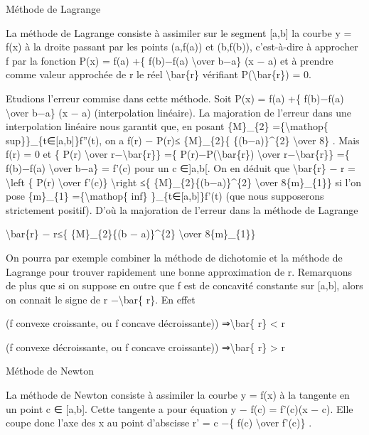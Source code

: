 \documentclass[]{article}
\begin{document}
Méthode de Lagrange

La méthode de Lagrange consiste à assimiler sur le segment {[}a,b{]} la
courbe y = f(x) à la droite passant par les points (a,f(a)) et (b,f(b)),
c'est-à-dire à approcher f par la fonction P(x) = f(a) +\{ f(b)−f(a)
\textbackslash{}over b−a\} (x − a) et à prendre comme valeur approchée
de r le réel \textbackslash{}bar\{r\} vérifiant
P(\textbackslash{}bar\{r\}) = 0.

Etudions l'erreur commise dans cette méthode. Soit P(x) = f(a) +\{
f(b)−f(a) \textbackslash{}over b−a\} (x − a) (interpolation linéaire).
La majoration de l'erreur dans une interpolation linéaire nous garantit
que, en posant \{M\}\_\{2\} =\{\textbackslash{}mathop\{
sup\}\}\_\{t∈{[}a,b{]}\}\textbar{}f''(t)\textbar{}, on a \textbar{}f(r)
− P(r)\textbar{}≤ \{M\}\_\{2\}\{ \{(b−a)\}\^{}\{2\} \textbackslash{}over
8\} . Mais f(r) = 0 et \{ P(r) \textbackslash{}over
r−\textbackslash{}bar\{r\}\} =\{ P(r)−P(\textbackslash{}bar\{r\})
\textbackslash{}over r−\textbackslash{}bar\{r\}\} =\{ f(b)−f(a)
\textbackslash{}over b−a\} = f'(c) pour un c ∈{]}a,b{[}. On en déduit
que \textbar{}\textbackslash{}bar\{r\} − r\textbar{} =
\textbackslash{}left \textbar{}\{ P(r) \textbackslash{}over f'(c)\}
\textbackslash{}right \textbar{}≤\{ \{M\}\_\{2\}\{(b−a)\}\^{}\{2\}
\textbackslash{}over 8\{m\}\_\{1\}\} si l'on pose \{m\}\_\{1\}
=\{\textbackslash{}mathop\{ inf\}
\}\_\{t∈{[}a,b{]}\}\textbar{}f'(t)\textbar{} (que nous supposerons
strictement positif). D'où la majoration de l'erreur dans la méthode de
Lagrange

\textbar{}\textbackslash{}bar\{r\} − r\textbar{}≤\{ \{M\}\_\{2\}\{(b −
a)\}\^{}\{2\} \textbackslash{}over 8\{m\}\_\{1\}\}

On pourra par exemple combiner la méthode de dichotomie et la méthode de
Lagrange pour trouver rapidement une bonne approximation de r.
Remarquons de plus que si on suppose en outre que f est de concavité
constante sur {[}a,b{]}, alors on connait le signe de r
−\textbackslash{}bar\{ r\}. En effet

(f convexe croissante, ou f concave décroissante))
⇒\textbackslash{}bar\{ r\} \textless{} r

(f convexe décroissante, ou f concave croissante))
⇒\textbackslash{}bar\{ r\} \textgreater{} r

Méthode de Newton

La méthode de Newton consiste à assimiler la courbe y = f(x) à la
tangente en un point c ∈ {[}a,b{]}. Cette tangente a pour équation y −
f(c) = f'(c)(x − c). Elle coupe donc l'axe des x au point d'abscisse r'
= c −\{ f(c) \textbackslash{}over f'(c)\} .
\end{document}
